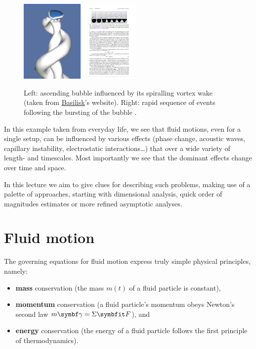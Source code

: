\begin{figure}[htbp]
\begin{center}
\includegraphics[height=4cm]{./pics/bubble_wake.png}
\includegraphics[height=4cm]{./pics/bubble_burst.pdf}
\caption{Left: ascending bubble influenced by its spiralling vortex wake (taken from \href{http://basilisk.fr/}{Basilisk}'s website). Right: rapid sequence of events following the bursting of the bubble \citep{Ghabache2014a}.}
\label{fig:bubble_life}
\end{center}
\end{figure}

In this example taken from everyday life, we see that fluid motions, even for a single setup, can be influenced by various effects (phase change, acoustic waves, capillary instability, electrostatic interactions\dots) that over a wide variety of length- and timescales. Most importantly we see that the dominant effects change over time and space. 

In this lecture we aim to give clues for describing such problems, making use of a palette of approaches, starting with dimensional analysis, quick order of magnitudes estimates or more refined asymptotic analyses.
\chapter[Fluid Motion]{Fluid {\bfseries motion}}
\label{chap:fluid-motion}

The governing equations for fluid motion express truly simple physical principles, namely: \begin{itemize}[nosep]
\item \textbf{mass} conservation (the mass $m(t)$ of a fluid particle is constant), 
\item \textbf{momentum} conservation (a fluid particle's momentum obeys Newton's second law $m \symbf \gamma = \Sigma \bF$), and 
\item \textbf{energy} conservation (the energy of a fluid particle follows the first principle of thermodynamics).
\end{itemize}
\vskip 1mm

